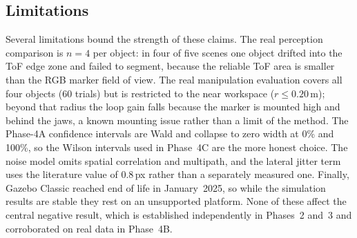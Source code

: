 \subsection{Limitations}
Several limitations bound the strength of these claims. The real perception comparison is
$n=4$ per object: in four of five scenes one object drifted into the ToF edge zone and
failed to segment, because the reliable ToF area is smaller than the RGB marker field of
view. The real manipulation evaluation covers all four objects (60 trials) but is restricted
to the near workspace ($r\le0.20$\,m); beyond that radius the loop gain falls because the
marker is mounted high and behind the jaws, a known mounting issue rather than a limit of the
method. The Phase-4A confidence intervals are Wald and collapse to zero width at 0\% and
100\%, so the Wilson intervals used in Phase~4C are the more honest choice. The noise model
omits spatial correlation and multipath, and the lateral jitter term uses the literature
value of $0.8$\,px \cite{nguyen2012modeling} rather than a separately measured one. Finally,
Gazebo Classic reached end of life in January~2025, so while the simulation results are
stable they rest on an unsupported platform. None of these affect the central negative
result, which is established independently in Phases~2 and~3 and corroborated on real data in
Phase~4B.

